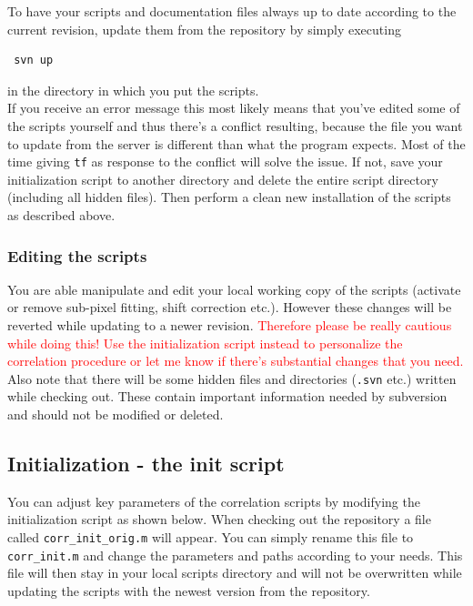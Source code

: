 \documentclass[10pt,a4paper,onepage,DIV12]{scrartcl}
\begin{document}
To have your scripts and documentation files always up to date according to the current revision, update them from the repository by simply executing
\begin{verbatim}
 svn up
\end{verbatim}
 in the directory in which you put the scripts.\\ 


If you receive an error message this most likely means that you've edited some of the scripts yourself and thus there's a conflict resulting, because the file you want to update from the server is different than what the program expects. Most of the time giving \verb|tf| as response to the conflict will solve the issue. If not, save your initialization script to another directory and delete the entire script directory (including all hidden files). Then perform a clean new installation of the scripts as described above.

\subsubsection*{Editing the scripts}
You are able manipulate and edit your local working copy of the scripts (activate or remove sub-pixel fitting, shift correction etc.). However these changes will be reverted while updating to a newer revision. \textcolor{red}{Therefore please be really cautious while doing this! Use the initialization script instead to personalize the correlation procedure or let me know if there's substantial changes that you need.}\\

Also note that there will be some hidden files and directories (\texttt{.svn} etc.) written while checking out. These contain important information needed by subversion and should not be modified or deleted.


\newpage
\subsection{Initialization - the init script}

You can adjust key parameters of the correlation scripts by modifying the initialization script as shown below. When checking out the repository a file called \texttt{corr\_init\_orig.m} will appear. You can simply rename this file to \texttt{corr\_init.m} and change the parameters and paths according to your needs. This file will then stay in your local scripts directory and will not be overwritten while updating the scripts with the newest version from the repository.\\
\end{document}
